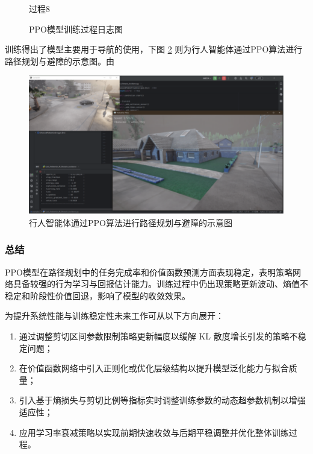 \begin{figure}[H]
\begin{minipage}{0.25\textwidth}
	   \caption*{过程8}
    \end{minipage}
    \caption{PPO模型训练过程日志图}
    \label{fig:training}
\end{figure}

训练得出了模型主要用于导航的使用，下图 \ref{fig:path_planning} 则为行人智能体通过PPO算法进行路径规划与避障的示意图。由

\begin{figure}[H]
    \centering
    \includegraphics[width=1\textwidth]{images/path_planning.pdf}
    \caption{行人智能体通过PPO算法进行路径规划与避障的示意图}
    \label{fig:path_planning}
\end{figure}

\subsubsection{总结}

PPO模型在路径规划中的任务完成率和价值函数预测方面表现稳定，表明策略网络具备较强的行为学习与回报估计能力。训练过程中仍出现策略更新波动、熵值不稳定和阶段性价值回退，影响了模型的收敛效果。

为提升系统性能与训练稳定性未来工作可从以下方向展开：

\begin{enumerate}
    \item 通过调整剪切区间参数限制策略更新幅度以缓解 KL 散度增长引发的策略不稳定问题；
    \item 在价值函数网络中引入正则化或优化层级结构以提升模型泛化能力与拟合质量；
    \item 引入基于熵损失与剪切比例等指标实时调整训练参数的动态超参数机制以增强适应性；
    \item 应用学习率衰减策略以实现前期快速收敛与后期平稳调整并优化整体训练过程。
\end{enumerate}

